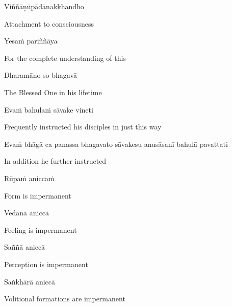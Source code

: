 Viññāṇūpādānakkhandho

\begin{english}
    Attachment to consciousness\makeatletter\hyperlink{endnote17-appendix}\makeatother
\end{english}

Yesaṁ pariññāya

\begin{english}
  For the complete understanding of this
\end{english}

Dharamāno so bhagavā

\begin{english}
  The Blessed One in his lifetime
\end{english}

Evaṁ bahulaṁ sāvake vineti

\begin{english}
  Frequently instructed his disciples in just this way
\end{english}

\begin{pali-hang}
  Evaṁ bhāgā ca panassa bhagavato sāvakesu anusāsanī bahulā pavattati
\end{pali-hang}

\begin{english}
  In addition he further instructed
\end{english}

Rūpaṁ aniccaṁ

\begin{english}
  Form is impermanent
\end{english}

Vedanā aniccā

\begin{english}
  Feeling is impermanent
\end{english}

Saññā aniccā

\begin{english}
  Perception is impermanent
\end{english}

Saṅkhārā aniccā

\begin{english}
    Volitional formations are impermanent\makeatletter\hyperlink{endnote18-appendix}\makeatother
\end{english}

